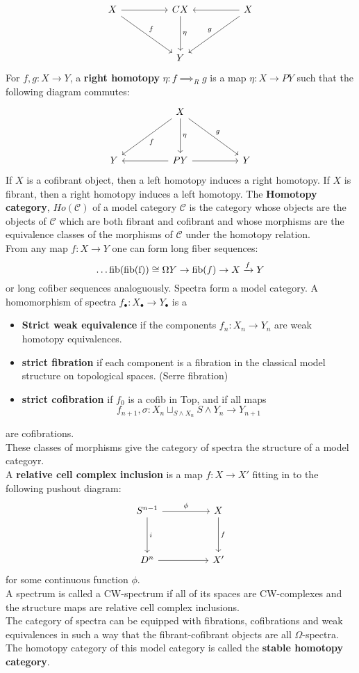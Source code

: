 \[
\ti
X \ar[dr, "f"] \ar[r] & CX \ar[d, "\eta"] & X \ar[l] \ar[dl, "g",swap]\\
& Y &
\kz
\]
For $f, g : X \to Y$, a \textbf{right homotopy} $\eta : f \implies_R g$ is a map $\eta :X \to PY$ such that the following diagram commutes:
\[
\ti
& X \ar[dl, "f"] \ar[dr, "g"] \ar[d, "{\eta}"]\\
Y &   PY \ar[l,] \ar[r, ] & Y
\kz
\]
If $X$ is a cofibrant object, then a left homotopy induces a right homotopy. If $X$ is fibrant, then a right homotopy induces a left homotopy.
The \textbf{Homotopy category}, $Ho(\mathcal{C})$ of a model category $\mathcal{C}$ is the category whose objects are the objects of $\mathcal{C}$ which are both fibrant and cofibrant and whose morphisms are the equivalence classes of the morphisms of $\mathcal{C}$ under the homotopy relation.\\
From any map $f: X \to Y$ one can form long fiber sequences:
\[
\dots \text{fib(fib(f))} \cong \Omega Y \to \text{fib}(f) \to X \xrightarrow{f} Y
\]
or long cofiber sequences analoguously.
Spectra form a model category. A homomorphism of spectra $f_{\bullet} : X_{\bullet} \to Y_{\bullet}$ is a
\begin{itemize}
\item \textbf{Strict weak equivalence} if the components $f_n : X_n \to Y_n$ are weak homotopy equivalences.
\item \textbf{strict fibration} if each component is a fibration in the classical model structure on topological spaces. (Serre fibration)
\item \textbf{strict cofibration} if $f_0$ is a cofib in Top, and if all maps
\[
f_{n+1}, \sigma : X_n \sqcup_{S \land X_{n}} S \land Y_{n} \to Y_{n+1}
\]
\end{itemize}
are cofibrations.\\
These classes of morphisms give the category of spectra the structure of a model categoyr.\\
A \textbf{relative cell complex inclusion} is a map $f : X \to X'$ fitting in to the following pushout diagram:
\[
\ti
S^{n-1} \ar[r,"\phi"] \ar[d, "i"] & X \ar[d,"f"]\\
D^n \ar[r] & X'
\kz
\]
for some continuous function $\phi$.\\
A spectrum is called a CW-spectrum if all of its spaces are CW-complexes and the structure maps are relative cell complex inclusions.\\
The category of spectra can be equipped with fibrations, cofibrations and weak equivalences in such a way that the fibrant-cofibrant objects are all $\Omega$-spectra. The homotopy category of this model category is called the \textbf{stable homotopy category}.\\

